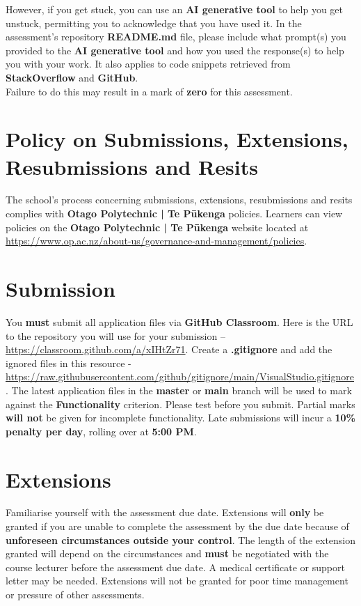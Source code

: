 \documentclass{article}
\begin{document}
 However, if you get stuck, you can use an \textbf{AI generative tool} to help you get unstuck, permitting you to acknowledge that you have used it. In the assessment's repository \textbf{README.md} file, please include what prompt(s) you provided to the \textbf{AI generative tool} and how you used the response(s) to help you with your work. It also applies to code snippets retrieved from \textbf{StackOverflow} and \textbf{GitHub}. \\
 
 Failure to do this may result in a mark of \textbf{zero} for this assessment.

\section*{Policy on Submissions, Extensions, Resubmissions and Resits}
The school's process concerning submissions, extensions, resubmissions and resits complies with \textbf{Otago Polytechnic | Te Pūkenga} policies. Learners can view policies on the \textbf{Otago Polytechnic | Te Pūkenga} website located at \href{https://www.op.ac.nz/about-us/governance-and-management/policies}{https://www.op.ac.nz/about-us/governance-and-management/policies}.

\section*{Submission}
You \textbf{must} submit all application files via \textbf{GitHub Classroom}. Here is the URL to the repository you will use for your submission – \href{https://classroom.github.com/a/xIHtZr71}{https://classroom.github.com/a/xIHtZr71}.  Create a \textbf{.gitignore} and add the ignored files in this resource - \href{https://raw.githubusercontent.com/github/gitignore/main/VisualStudio.gitignore}{https://raw.githubusercontent.com/github/gitignore/main/VisualStudio.gitignore}. The latest application files in the \textbf{master} or \textbf{main} branch will be used to mark against the \textbf{Functionality} criterion. Please test before you submit. Partial marks \textbf{will not} be given for incomplete functionality. Late submissions will incur a \textbf{10\% penalty per day}, rolling over at \textbf{5:00 PM}.

\section*{Extensions}
Familiarise yourself with the assessment due date. Extensions will \textbf{only} be granted if you are unable to complete the assessment by the due date because of \textbf{unforeseen circumstances outside your control}. The length of the extension granted will depend on the circumstances and \textbf{must} be negotiated with the course lecturer before the assessment due date. A medical certificate or support letter may be needed. Extensions will not be granted for poor time management or pressure of other assessments.
\end{document}
